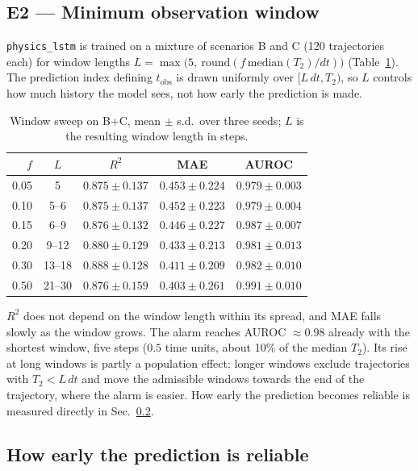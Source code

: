 \documentclass[twocolumn,10pt]{article}
\begin{document}
\subsection{E2 --- Minimum observation window}
\label{sec:e2}

\texttt{physics\_lstm} is trained on a mixture of scenarios B and C
(120 trajectories each) for window lengths
$L = \max\bigl(5,\ \mathrm{round}(f\,\mathrm{median}(T_2)/dt)\bigr)$
(Table~\ref{tab:e2}). The prediction index defining $t_\mathrm{obs}$ is drawn uniformly
over $[L\,dt, T_2)$, so $L$ controls how much history the model sees, not
how early the prediction is made.

\begin{table}[h]
\centering
\caption{Window sweep on B+C, mean $\pm$ s.d.\ over three seeds; $L$ is
  the resulting window length in steps.\label{tab:e2}}
\footnotesize
\setlength{\tabcolsep}{3pt}
\begin{tabular}{rcccc}
\toprule
$f$ & $L$ & $R^2$ & MAE & AUROC \\
\midrule
0.05 & 5     & $0.875 \pm 0.137$ & $0.453 \pm 0.224$ & $0.979 \pm 0.003$ \\
0.10 & 5--6  & $0.875 \pm 0.137$ & $0.452 \pm 0.223$ & $0.979 \pm 0.004$ \\
0.15 & 6--9  & $0.876 \pm 0.132$ & $0.446 \pm 0.227$ & $0.987 \pm 0.007$ \\
0.20 & 9--12 & $0.880 \pm 0.129$ & $0.433 \pm 0.213$ & $0.981 \pm 0.013$ \\
0.30 & 13--18 & $0.888 \pm 0.128$ & $0.411 \pm 0.209$ & $0.982 \pm 0.010$ \\
0.50 & 21--30 & $0.876 \pm 0.159$ & $0.403 \pm 0.261$ & $0.991 \pm 0.010$ \\
\bottomrule
\end{tabular}
\end{table}

$R^2$ does not depend on the window length within its spread, and MAE
falls slowly as the window grows. The alarm reaches AUROC $\approx0.98$
already with the shortest window, five steps ($0.5$ time units, about
10\% of the median $T_2$). Its rise at long windows is partly a
population effect: longer windows exclude trajectories with
$T_2 < L\,dt$ and move the admissible windows towards the end of the
trajectory, where the alarm is easier. How early the prediction becomes reliable is
measured directly in Sec.~\ref{sec:r18}.

\subsection{How early the prediction is reliable}
\label{sec:r18}
\end{document}
